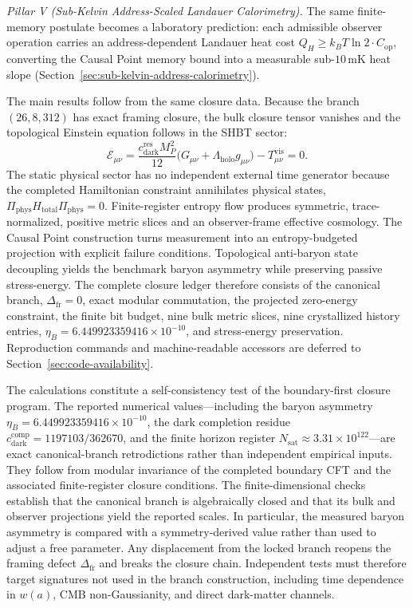 \documentclass[11pt,letterpaper]{article}
\theoremstyle{plain}
\newcommand{\Deltafr}{\Delta_{\text{fr}}}
\newcommand{\cdarkres}{c_{\text{dark}}^{\text{res}}}
\newcommand{\Lholo}{\Lambda_{\text{holo}}}
\newcommand{\MP}{M_P}
\newcommand{\Ebulk}{\mathcal E_{\mu\nu}}
\newcommand{\Htotal}{H_{\text{total}}}
\begin{document}
\emph{Pillar V (Sub-Kelvin Address-Scaled Landauer Calorimetry).}  The same
finite-memory postulate becomes a laboratory prediction: each admissible
observer operation carries an address-dependent Landauer heat cost
\(Q_H\ge k_BT\ln2\cdot C_{\text{op}}\), converting the Causal Point memory
bound into a measurable sub-\(10\,\mathrm{mK}\) heat slope
(Section~\ref{sec:sub-kelvin-address-calorimetry}).

The main results follow from the same closure data.  Because the branch
$(26,8,312)$ has exact framing closure, the bulk closure tensor vanishes and
the topological Einstein equation follows in the SHBT sector:
\begin{equation}
 \Ebulk
 =
 \frac{\cdarkres\MP^2}{12}
 \bigl(G_{\mu\nu}+\Lholo g_{\mu\nu}\bigr)
 -T_{\mu\nu}^{\text{vis}}
 =0.
\end{equation}
The static physical sector has no independent external time generator because
the completed Hamiltonian constraint annihilates physical states,
$\Pi_{\text{phys}}\Htotal\Pi_{\text{phys}}=0$.  Finite-register entropy flow produces
symmetric, trace-normalized, positive metric slices and an observer-frame
effective cosmology.  The Causal Point construction turns measurement into an
entropy-budgeted projection with explicit failure conditions.  Topological anti-baryon
state decoupling yields the benchmark baryon asymmetry while preserving passive
stress-energy.  The complete closure ledger therefore consists of the
canonical branch, \(\Deltafr=0\), exact modular commutation, the projected
zero-energy constraint, the finite bit budget, nine bulk metric slices, nine
crystallized history entries, \(\eta_B=6.449923359416\times10^{-10}\), and
stress-energy preservation.  Reproduction commands and machine-readable
accessors are deferred to Section~\ref{sec:code-availability}.

The calculations constitute a self-consistency test of the boundary-first
closure program.  The reported numerical values---including
the baryon asymmetry \(\eta_B=6.449923359416\times10^{-10}\), the dark
completion residue \(c_{\text{dark}}^{\text{comp}}=1197103/362670\), and the finite
horizon register \(N_{\text{sat}}\approx3.31\times10^{122}\)---are exact
canonical-branch retrodictions rather than independent empirical inputs.  They
follow from modular invariance of the completed boundary CFT and the associated
finite-register closure conditions.  The finite-dimensional checks establish
that the canonical branch is algebraically closed and that its bulk and
observer projections yield the reported scales.  In particular, the measured
baryon asymmetry is compared with a symmetry-derived value rather than used to
adjust a free parameter.  Any displacement from the locked branch reopens the
framing defect \(\Delta_{\text{fr}}\) and breaks the closure chain.  Independent
tests must therefore target signatures not used in the branch construction,
including time dependence in \(w(a)\), CMB non-Gaussianity, and direct
dark-matter channels.
\end{document}
